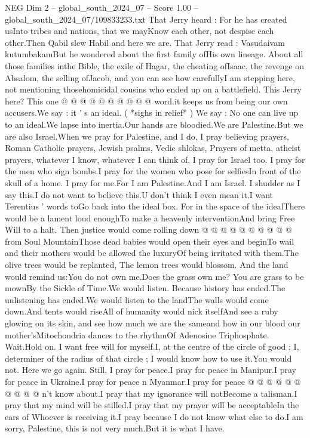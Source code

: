 \begin{textsample}{NEG Dim 2 – global\_south\_2024\_07 – Score 1.00 – global\_south\_2024\_07/109833233.txt}
That Jerry heard : For he has created usInto tribes and nations, that we mayKnow each other, not despise each other.Then Qabil slew Habil and here we are.
That Jerry read : Vasudaivam kutumbakamBut he wondered about the first family ofHis own lineage.
About all those families inthe Bible, the exile of Hagar, the cheating ofIsaac, the revenge on Absalom, the selling ofJacob, and you can see how carefullyI am stepping here, not mentioning thosehomicidal cousins who ended up on a battlefield.
This Jerry here?
This one @ @ @ @ @ @ @ @ @ @ word.it keeps us from being our own accusers.We say : it ' s an ideal. ( *sighs in relief* ) We say : No one can live up to an ideal.We lapse into inertia.Our hands are bloodied.We are Palestine.But we are also Israel.When we pray for Palestine, and I do, I pray believing prayers, Roman Catholic prayers, Jewish psalms, Vedic shlokas, Prayers of metta, atheist prayers, whatever I know, whatever I can think of, I pray for Israel too.
I pray for the men who sign bombs.I pray for the women who pose for selfiesIn front of the skull of a home.
I pray for me.For I am Palestine.And I am Israel.
I shudder as I say this.I do not want to believe this.U don't think I even mean it.I want Terentius ' words toGo back into the ideal box.
For in the space of the idealThere would be a lament loud enoughTo make a heavenly interventionAnd bring Free Will to a halt.
Then justice would come rolling down @ @ @ @ @ @ @ @ @ @ from Soul MountainThose dead babies would open their eyes and beginTo wail and their mothers would be allowed the luxuryOf being irritated with them.The olive trees would be replanted, The lemon trees would blossom.
And the land would remind us:You do not own me.Does the grass own me?
You are grass to be mownBy the Sickle of Time.We would listen.
Because history has ended.The unlistening has ended.We would listen to the landThe walls would come down.And tents would riseAll of humanity would nick itselfAnd see a ruby glowing on its skin, and see how much we are the sameand how in our blood our mother'sMitochondria dances to the rhythmOf Adenosine Triphosphate.
Wait.Hold on.
I want free will for myself.I, at the centre of the circle of good ; I, determiner of the radius of that circle ; I would know how to use it.You would not.
Here we go again.
Still, I pray for peace.I pray for peace in Manipur.I pray for peace in Ukraine.I pray for peace n Myanmar.I pray for peace @ @ @ @ @ @ @ @ @ @ n't know about.I pray that my ignorance will notBecome a talisman.I pray that my mind will be stilled.I pray that my prayer will be acceptableIn the ears of Whoever is receiving it.I pray because I do not know what else to do.I am sorry, Palestine, this is not very much.But it is what I have.

\end{textsample}
